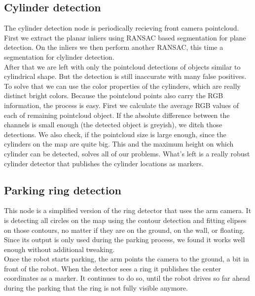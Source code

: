 \documentclass[a4paper,
  twoside, %
  headlines=2.1 %
  ]{scrartcl}
\begin{document}
\subsection{Cylinder detection}
The cylinder detection node is periodically recieving front camera pointcloud. First we extract the planar inliers using RANSAC based segmentation for plane detection. On the inliers we then perform another RANSAC, this time a segmentation for clylinder detection.\\
After that we are left with only the pointcloud detections of objects similar to cylindrical shape. But the detection is still inaccurate with many false positives.\\
To solve that we can use the color properties of the cylinders, which are really distinct bright colors. Because the pointcloud points also carry the RGB information, the process is easy. First we calculate the average RGB values of each of remaining pointcloud object. If the absolute difference between the channels is small enough (the detected object is greyish), we ditch those detections. We also check, if the pointcloud size is large enough, since the cylinders on the map are quite big. This and the maximum height on which cylinder can be detected, solves all of our problems. What's left is a really robust cylinder detector that publishes the cylinder locations as markers.

\subsection{Parking ring detection}
This node is a simplified version of the ring detector that uses the arm camera. It is detecting all circles on the map using the contour detection and fitting elipses on those contours, no matter if they are on the ground, on the wall, or floating. Since its output is only used during the parking process, we found it works well enough without additional tweaking.\\
Once the robot starts parking, the arm points the camera to the ground, a bit in front of the robot. When the detector sees a ring it publishes the center coordinates as a marker. It continues to do so, until the robot drives so far ahead during the parking that the ring is not fully visible anymore.
\end{document}
